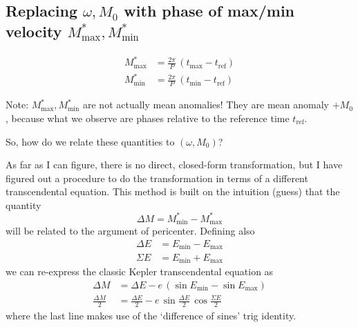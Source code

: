 \documentclass{article}
\begin{document}
\subsection{Replacing $\omega, M_0$ with phase of max/min velocity
$M^*_{\mathrm{max}}, M^*_{\mathrm{min}}$}

\begin{align}
M^*_{\mathrm{max}} &= \frac{2\pi}{P} \, (t_{\mathrm{max}} - t_{\mathrm{ref}}) \\
M^*_{\mathrm{min}} &= \frac{2\pi}{P} \, (t_{\mathrm{min}} - t_{\mathrm{ref}})
\end{align}

Note: $M^*_{\mathrm{max}}, M^*_{\mathrm{min}}$ are not actually mean anomalies!
They are mean anomaly $+ M_0$, because what we observe are phases relative to
the reference time $t_{\mathrm{ref}}$.

So, how do we relate these quantities to $(\omega, M_0)$?

As far as I can figure, there is no direct, closed-form transformation, but I
have figured out a procedure to do the transformation in terms of a different
transcendental equation. This method is built on the intuition (guess) that the
quantity
\begin{equation}
    \Delta M = M^*_{\mathrm{min}} - M^*_{\mathrm{max}}
\end{equation}
will be related to the argument of pericenter. Defining also
\begin{align}
    \Delta E &= E_{\mathrm{min}} - E_{\mathrm{max}} \\
    \Sigma E &= E_{\mathrm{min}} + E_{\mathrm{max}}
\end{align}
we can re-express the classic Kepler transcendental equation as
\begin{align}
    \Delta M &= \Delta E - e\, (\sin E_{\mathrm{min}} - \sin E_{\mathrm{max}})\\
    \frac{\Delta M}{2} &= \frac{\Delta E}{2} - e\, \sin\frac{\Delta E}{2} \, \cos\frac{\Sigma E}{2}
\end{align}
where the last line makes use of the `difference of sines' trig identity.
\end{document}
